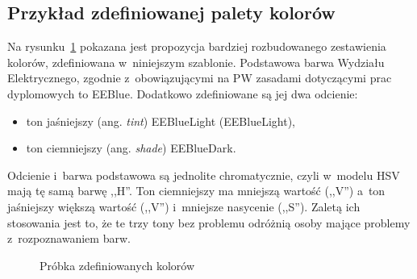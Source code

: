 \subsection{Przykład zdefiniowanej palety kolorów}
Na rysunku~\ref{rys:colorsample} pokazana jest propozycja bardziej rozbudowanego zestawienia kolorów, zdefiniowana w~niniejszym szablonie. Podstawowa barwa Wydziału Elektrycznego, zgodnie z~obowiązującymi na PW zasadami dotyczącymi prac dyplomowych to \textcolor{EEBlue}{EEBlue}. Dodatkowo zdefiniowane są jej dwa odcienie:
\begin{itemize}
    \item ton jaśniejszy (ang. \textit{tint}) \textcolor{EEBlueLight}{EEBlueLight} (EEBlueLight),
    \item ton ciemniejszy (ang. \textit{shade}) \textcolor{EEBlueDark}{EEBlueDark}.
\end{itemize}
Odcienie i~barwa podstawowa są jednolite chromatycznie, czyli w~modelu HSV mają tę samą barwę ,,H''. Ton ciemniejszy ma mniejszą wartość (,,V'') a~ton jaśniejszy większą wartość (,,V'') i~mniejsze nasycenie (,,S''). Zaletą ich stosowania jest to, że te trzy tony bez problemu odróżnią osoby mające problemy z~rozpoznawaniem barw.

\begin{figure}[!ht]
    \centering
    \caption{Próbka zdefiniowanych kolorów}
    \label{rys:colorsample}
\end{figure}

